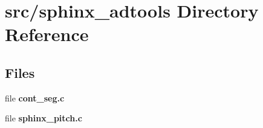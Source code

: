 \section{src/sphinx\+\_\+adtools Directory Reference}
\label{dir_626a4c20570d8d1011e4cc5b6ee6b8c0}
\subsection*{Files}
\begin{DoxyCompactItemize}
\item 
file {\bfseries cont\+\_\+seg.\+c}
\item 
file {\bfseries sphinx\+\_\+pitch.\+c}
\end{DoxyCompactItemize}
